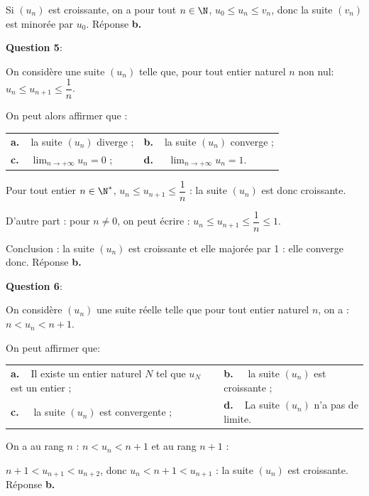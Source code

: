 Si $\left(u_n\right)$ est croissante, on a pour tout $n \in \N$,\: $u_0 \leqslant u_n \leqslant v_n$, donc la suite $\left(v_n\right)$ est minorée par $u_0$. Réponse \textbf{b.}

\medskip

\textbf{Question 5}:

\medskip

On considère une suite $\left(u_n\right)$ telle que, pour tout entier naturel $n$ non nul: $u_n \leqslant  u_{n+1}  \leqslant \dfrac1n$.

On peut alors affirmer que : 

\begin{center}
\begin{tabularx}{\linewidth}{X X}
\textbf{a.~~}la suite $\left(u_n\right)$ diverge ;&\textbf{b.~~}la suite $\left(u_n\right)$ converge ;\\
\textbf{c.~~}$\displaystyle\lim_{n \to + \infty} u_n =  0$ ;&\textbf{d.~~} $\displaystyle\lim_{n \to + \infty} u_n =  1$.
\end{tabularx}
\end{center}

Pour tout entier $n \in \N^{*}$, \: $u_n \leqslant u_{n+1} \leqslant \dfrac1n$ : la suite 
$\left(u_n\right)$ est donc croissante.

D'autre part : pour $n \ne 0$, on peut écrire : $u_n \leqslant u_{n+1} \leqslant \dfrac1n \leqslant 1$.

Conclusion  : la suite $\left(u_n\right)$ est croissante et elle majorée par 1 : elle converge donc. Réponse \textbf{b.}
\medskip

\textbf{Question 6}:

\medskip

On considère $\left(u_n\right)$ une suite réelle telle que pour tout entier naturel $n$, on a : $n < u_n < n + 1$. 

On peut affirmer que:

\begin{center}
\begin{tabularx}{\linewidth}{X X}
\textbf{a.~~}Il existe un entier naturel $N$ tel que $u_N$ est un entier ;&\textbf{b.~~} la suite $\left(u_n\right)$ est croissante ;\\
\textbf{c.~~} la suite $\left(u_n\right)$ est convergente ;&\textbf{d.~~}La suite $\left(u_n\right)$ n'a pas de limite.
\end{tabularx}
\end{center}

On a au rang $n$ : $n < u_n < n+1$ et au rang $n+1$ :

$n + 1 < u_{n+1} < u_{n+2}$, donc $u_n < n+1 < u_{n+1}$ : la suite $\left(u_n\right)$ est croissante. Réponse \textbf{b.}
